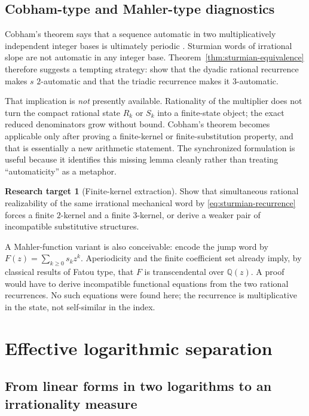 \documentclass[11pt,oneside]{article}
\theoremstyle{definition}
\newtheorem{target}[theorem]{Research target}
\theoremstyle{remark}
\newcommand{\Q}{\mathbb Q}
\begin{document}
\subsection{Cobham-type and Mahler-type diagnostics}

Cobham's theorem says that a sequence automatic in two multiplicatively independent integer
bases is ultimately periodic \cite{Cobham1972,AlloucheShallit2003}.  Sturmian words of
irrational slope are not automatic in any integer base.  Theorem~\ref{thm:sturmian-equivalence}
therefore suggests a tempting strategy: show that the dyadic rational recurrence makes $s$
$2$-automatic and that the triadic recurrence makes it $3$-automatic.

That implication is \emph{not} presently available.  Rationality of the multiplier does not
turn the compact rational state $R_k$ or $S_k$ into a finite-state object; the exact reduced
denominators grow without bound.  Cobham's theorem becomes applicable only after proving a
finite-kernel or finite-substitution property, and that is essentially a new arithmetic
statement.  The synchronized formulation is useful because it identifies this missing lemma
cleanly rather than treating ``automaticity'' as a metaphor.

\begin{target}[Finite-kernel extraction]
Show that simultaneous rational realizability of the same irrational mechanical word by
\eqref{eq:sturmian-recurrence} forces a finite $2$-kernel and a finite $3$-kernel, or derive a
weaker pair of incompatible substitutive structures.
\end{target}

A Mahler-function variant is also conceivable: encode the jump word by
$F(z)=\sum_{k\ge0}s_kz^k$.  Aperiodicity and the finite coefficient set already imply, by
classical results of Fatou type, that $F$ is transcendental over $\Q(z)$.  A proof would have
to derive incompatible functional equations from the two rational recurrences.  No such
equations were found here; the recurrence is multiplicative in the state, not self-similar in
the index.

\section{Effective logarithmic separation}
\label{sec:baker}

\subsection{From linear forms in two logarithms to an irrationality measure}
\end{document}

